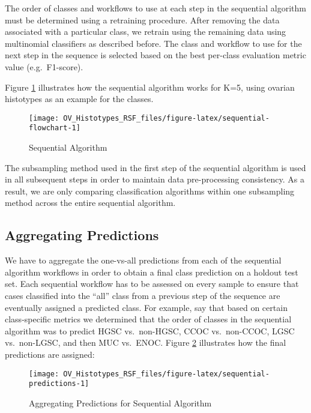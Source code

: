 \documentclass[
]{report}
\begin{document}
The order of classes and workflows to use at each step in the sequential algorithm must be determined using a retraining procedure. After removing the data associated with a particular class, we retrain using the remaining data using multinomial classifiers as described before. The class and workflow to use for the next step in the sequence is selected based on the best per-class evaluation metric value (e.g.~F1-score).

Figure \ref{fig:sequential-flowchart} illustrates how the sequential algorithm works for K=5, using ovarian histotypes as an example for the classes.

\begin{figure}[H]

{\centering \texttt{[image: OV\_Histotypes\_RSF\_files/figure-latex/sequential-flowchart-1]} 

}

\caption{Sequential Algorithm}\label{fig:sequential-flowchart}
\end{figure}

The subsampling method used in the first step of the sequential algorithm is used in all subsequent steps in order to maintain data pre-processing consistency. As a result, we are only comparing classification algorithms within one subsampling method across the entire sequential algorithm.

\subsection{Aggregating Predictions}\label{aggregating-predictions-1}

We have to aggregate the one-vs-all predictions from each of the sequential algorithm workflows in order to obtain a final class prediction on a holdout test set. Each sequential workflow has to be assessed on every sample to ensure that cases classified into the ``all'' class from a previous step of the sequence are eventually assigned a predicted class. For example, say that based on certain class-specific metrics we determined that the order of classes in the sequential algorithm was to predict HGSC vs.~non-HGSC, CCOC vs.~non-CCOC, LGSC vs.~non-LGSC, and then MUC vs.~ENOC. Figure \ref{fig:sequential-predictions} illustrates how the final predictions are assigned:

\begin{figure}[H]

{\centering \texttt{[image: OV\_Histotypes\_RSF\_files/figure-latex/sequential-predictions-1]} 

}

\caption{Aggregating Predictions for Sequential Algorithm}\label{fig:sequential-predictions}
\end{figure}
\end{document}
